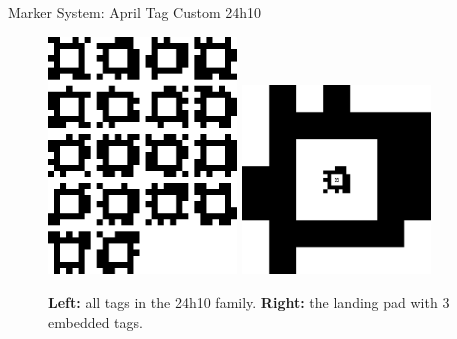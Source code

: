 \documentclass[final, 20pt]{beamer}
\newlength{\colwidth}
\begin{document}
\begin{frame}[t]
\begin{columns}[t]
\begin{column}{\colwidth}
\begin{block}{Marker System: April Tag Custom 24h10}
    \begin{figure}
      \centering
      \includegraphics[width=5cm]{images/mosaic.png}
      \hspace{1cm}
      \includegraphics[width=5cm]{images/tagCustom24h10_00002_00001_00000}
      \caption{\textbf{Left:} all tags in the 24h10 family. \textbf{Right:} the landing pad with 3 embedded tags.}
    \end{figure}


\end{block}
\end{column}
\end{columns}
\end{frame}
\end{document}
